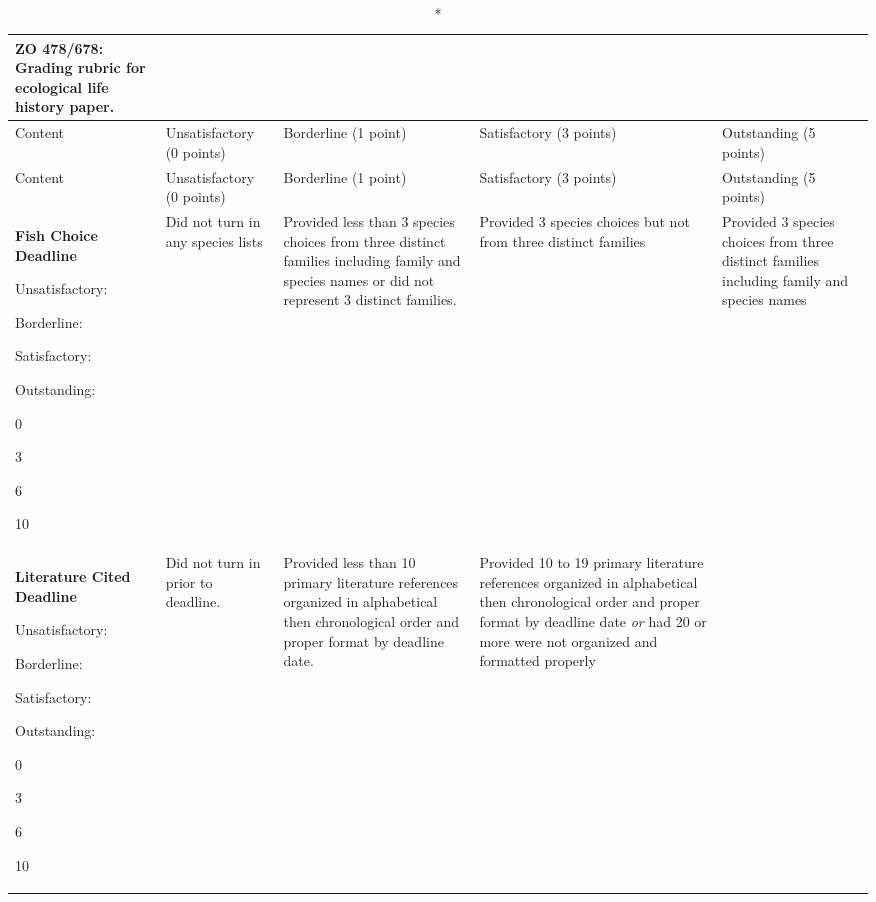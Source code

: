 \documentclass[10pt, twoside]{article}
\begin{document}
\begin{landscape}
{\small%
\begin{longtable}[l]{@{}L{5cm}L{4cm}L{4cm}L{4cm}L{4cm}@{}}
\caption*{\textbf{ZO 478/678: Grading rubric for ecological life history paper.}}\\
\toprule
Content & Unsatisfactory (0 points) & Borderline (1 point) & Satisfactory (3 points) & Outstanding (5 points) \\ 
\midrule
\endfirsthead
\toprule
Content & Unsatisfactory (0 points) & Borderline (1 point) & Satisfactory (3 points) & Outstanding (5 points) \\ 
\midrule
\endhead
\textbf{Fish Choice Deadline}%
\begin{multicols}{2}
\quad Unsatisfactory:\par
\quad Borderline:\par
\quad Satisfactory:\par
\quad Outstanding:\par
0\par
3\par
6\par
10\par
\end{multicols}&%
Did not turn in any species lists	&%
Provided less than 3 species choices from three distinct families including family and species names or did not represent 3 distinct families. &%
Provided 3 species choices but not from three distinct families &%
Provided 3 species choices from three distinct families including family and species names\\
\midrule
\textbf{Literature Cited Deadline}%
\begin{multicols}{2}
\quad Unsatisfactory:\par
\quad Borderline:\par
\quad Satisfactory:\par
\quad Outstanding:\par
0\par
3\par
6\par
10\par
\end{multicols}&%
Did not turn in prior to deadline.	&%
Provided less than 10 primary literature references organized in alphabetical then chronological order and proper format by deadline date. &%
Provided 10 to 19 primary literature references organized in alphabetical then chronological order and proper format by deadline date \textit{or} had 20 or more were not organized and formatted properly &%

\end{longtable}}
\end{landscape}
\end{document}
